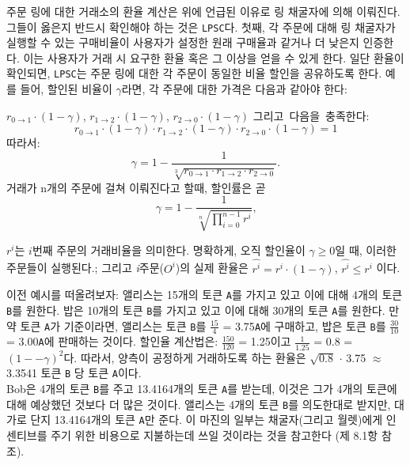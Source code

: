 \documentclass{article}
\begin{document}
\begin{multicols}{2}
주문 링에 대한 거래소의 환율 계산은 위에 언급된 이유로 링 채굴자에 의해 이뤄진다. 그들이 옳은지 반드시 확인해야 하는 것은 \verb|LPSC|다. 첫째, 각 주문에 대해 링 채굴자가 실행할 수 있는 구매비율이 사용자가 설정한 원래 구매율과 같거나 더 낮은지 인증한다. 이는 사용자가 거래 시 요구한 환율 혹은 그 이상을 얻을 수 있게 한다. 일단 환율이 확인되면, \verb|LPSC|는 주문 링에 대한 각 주문이 동일한 비율 할인을 공유하도록 한다. 예를 들어, 할인된 비율이 $\gamma$라면, 각 주문에 대한 가격은 다음과 같아야 한다:

$r_{0\rightarrow 1} \cdot (1-\gamma)$, $r_{1\rightarrow 2} \cdot (1-\gamma)$, $r_{2 \rightarrow 0} \cdot (1-\gamma)$
그리고\ 다음을\ 충족한다:\\
\begin{equation}
r_{0\rightarrow 1} \cdot (1-\gamma)\cdot r_{1\rightarrow 2} \cdot (1-\gamma) \cdot r_{2 \rightarrow 0} \cdot (1-\gamma) = 1
\end{equation}
따라서:\\
\begin{equation}
\gamma = 1- \frac{1}{\sqrt[3]{r_{0\rightarrow 1} \cdot r_{1\rightarrow 2} \cdot r_{2\rightarrow 0}}}\text{.}
\end{equation}
\indent 거래가 n개의 주문에 걸쳐 이뤄진다고 할때, 할인률은 곧\\
\begin{equation}
\gamma = 1- \frac{1}{\sqrt[n]{\prod_{i=0}^{n-1} r^i}} \text{,}
\end{equation}

 $r^i$는 $i$번째 주문의 거래비율을 의미한다. 명확하게, 오직 할인율이 $\gamma \ge 0$일 때, 이러한 주문들이 실행된다.; 그리고 \textit{i}주문($O^i$)의 실제 환율은 $\hat{r^i} = r^i \cdot (1-\gamma)$, $\hat{r^i}\le r^i$ 이다.
 
 이전 예시를 떠올려보자: 앨리스는 15개의 토큰 \verb|A|를 가지고 있고 이에 대해 4개의 토큰 \verb|B|를 원한다. 밥은 10개의 토큰 \verb|B|를 가지고 있고 이에 대해 30개의 토큰 \verb|A|를 원한다. 만약 토큰 \verb|A|가 기준이라면, 앨리스는 토큰 \verb|B|를 $\frac{15}{4}$ = 3.75\verb|A|에 구매하고, 밥은 토큰 \verb|B|를 $\frac{30}{10}$ = 3.00\verb|A|에 판매하는 것이다. 할인율 계산법은: $\frac{150}{120}$ = 1.25이고 $\frac{1}{1.25}$ = 0.8 = $(1 −- \gamma)^2$다. 따라서, 양측이 공정하게 거래하도록 하는 환율은 $\sqrt{0.8}$ $\cdot$ 3.75 $\approx$ 3.3541 토큰 \verb|B| 당 토큰 \verb|A|이다.\\
 
 Bob은 4개의 토큰 \verb|B|를 주고 13.4164개의 토큰 \verb|A|를 받는데, 이것은 그가 4개의 토큰에 대해 예상했던 것보다 더 많은 것이다. 앨리스는 4개의 토큰 \verb|B|를 의도한대로 받지만, 대가로 단지 13.4164개의 토큰 \verb|A|만 준다. 이 마진의 일부는 채굴자(그리고 월렛)에게 인센티브를 주기 위한 비용으로 지불하는데 쓰일 것이라는 것을 참고한다 (제 8.1항 참조).
 

\end{multicols}
\end{document}
